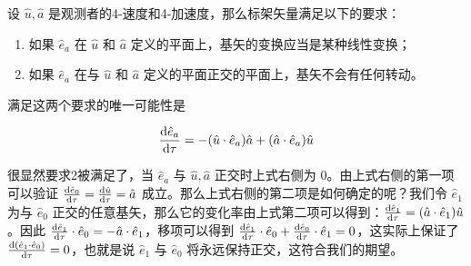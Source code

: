 设 $\hat{u},\hat{a}$ 是观测者的4-速度和4-加速度，那么标架矢量满足以下的要求：
\begin{enumerate}
\item 如果 $\hat{e}_a$ 在 $\hat u$ 和 $\hat a$ 定义的平面上，基矢的变换应当是某种线性变换；
\item 如果 $\hat{e}_a$ 在与 $\hat u$ 和 $\hat a$ 定义的平面正交的平面上，基矢不会有任何转动。
\end{enumerate}

满足这两个要求的唯一可能性是

\begin{equation}
\begin{aligned}
\frac{{\rm d} \hat{e}_a}{{\rm d} \tau}=-(\hat u\cdot\hat{e}_a)\hat a+ (\hat a\cdot \hat{e}_a)\hat u
\end{aligned}
\end{equation}

很显然要求2被满足了，当 $\hat{e}_a$ 与 $\hat u,\hat a$ 正交时上式右侧为 0。由上式右侧的第一项可以验证 $\frac{{\rm d}\hat{e}_0}{{\rm d}\tau}=\frac{{\rm d}\hat u}{{\rm d}\tau}=\hat a$ 成立。那么上式右侧的第二项是如何确定的呢？我们令 $\hat{e}_1$ 为与 $\hat{e}_0$ 正交的任意基矢，那么它的变化率由上式第二项可以得到：$\frac{{\rm d}\hat{e}_1}{{\rm d}\tau}=(\hat a\cdot \hat{e}_1)\hat u$。因此 $\frac{{\rm d}\hat{e}_1}{{\rm d}\tau}\cdot \hat{e}_0=-\hat a\cdot \hat{e}_1$，移项可以得到 $\frac{{\rm d}\hat{e}_1}{{\rm d}\tau}\cdot \hat{e}_0+ \frac{{\rm d}\hat{e}_0}{{\rm d}\tau} \cdot \hat{e}_1=0$，这实际上保证了 $\frac{{\rm d} (\hat{e}_1\cdot \hat{e}_0)}{{\rm d}\tau}=0$，也就是说 $\hat{e}_1$ 与 $\hat{e}_0$ 将永远保持正交，这符合我们的期望。
